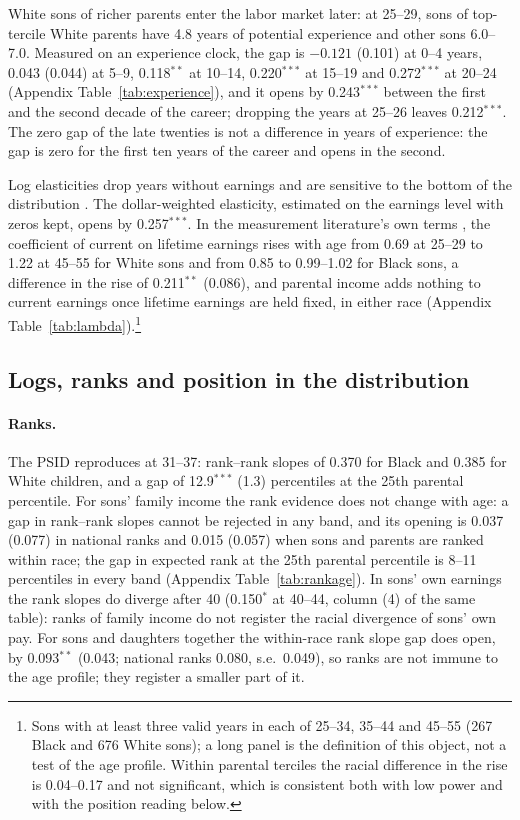 White sons of richer parents enter the labor market later: at 25--29, sons of top-tercile White parents have 4.8 years
of potential experience and other sons 6.0--7.0. Measured on an experience clock, the gap is $-0.121$ (0.101) at 0--4
years, 0.043 (0.044) at 5--9, 0.118$^{**}$ at 10--14, 0.220$^{***}$ at 15--19 and 0.272$^{***}$ at 20--24 (Appendix
Table~\ref{tab:experience}), and it opens by 0.243$^{***}$ between the first and the second decade of the career; dropping
the years at 25--26 leaves 0.212$^{***}$. The zero gap of the late twenties is not a difference in years of experience:
the gap is zero for the first ten years of the career and opens in the second.

Log elasticities drop years without earnings and are sensitive to the bottom of the distribution
\citep{mitnik2015new, mitnik2020intergenerational}. The dollar-weighted elasticity, estimated on the earnings level with
zeros kept, opens by 0.257$^{***}$. In the measurement literature's own terms \citep{haider2006life,
nybom2016heterogeneous}, the coefficient of current on lifetime earnings rises with age from 0.69 at 25--29 to 1.22 at
45--55 for White sons and from 0.85 to 0.99--1.02 for Black sons, a difference in the rise of 0.211$^{**}$ (0.086), and
parental income adds nothing to current earnings once lifetime earnings are held fixed, in either race (Appendix
Table~\ref{tab:lambda}).\footnote{Sons with at least three valid years in each of 25--34, 35--44 and 45--55 (267 Black
and 676 White sons); a long panel is the definition of this object, not a test of the age profile. Within parental
terciles the racial difference in the rise is 0.04--0.17 and not significant, which is consistent both with low power
and with the position reading below.}



\subsection{Logs, ranks and position in the distribution}

\paragraph{Ranks.} The PSID reproduces \citet{chetty2020race} at 31--37: rank--rank slopes of 0.370 for Black and
0.385 for White children, and a gap of 12.9$^{***}$ (1.3) percentiles at the 25th parental percentile. For sons' family income the rank
evidence does not change with age: a gap in rank--rank slopes cannot be rejected in any band, and its opening is 0.037
(0.077) in national ranks and 0.015 (0.057) when sons and parents are ranked within race; the gap in expected rank at
the 25th parental percentile is 8--11 percentiles in every band (Appendix Table~\ref{tab:rankage}). In sons' own
earnings the rank slopes do diverge after 40 (0.150$^{*}$ at 40--44, column (4) of the same table): ranks of family
income do not register the racial divergence of sons' own pay. For sons and
daughters together the within-race rank slope gap does open, by 0.093$^{**}$ (0.043; national ranks 0.080, s.e.\ 0.049),
so ranks are not immune to the age profile; they register a smaller part of it.

